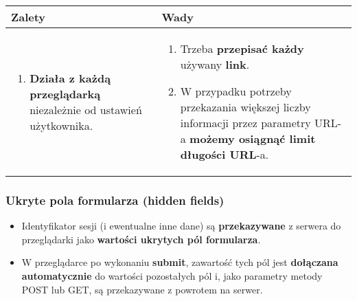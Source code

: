 \documentclass[../main.tex]{subfiles}
\begin{document}
    \begin{table}[H]
        \begin{center}
            \begin{tabular}{p{8cm} | p{8cm}}
                \textbf{Zalety} & \textbf{Wady} \\
                \hline
                \begin{enumerate}
                    \item \textbf{Działa z każdą przeglądarką} niezależnie od ustawień użytkownika.
                \end{enumerate}
                &
                \begin{enumerate}
                    \item Trzeba \textbf{przepisać każdy} używany \textbf{link}.
                    \item W przypadku potrzeby przekazania większej liczby informacji przez parametry URL-a \textbf{możemy osiągnąć limit długości URL}-a.
                \end{enumerate} \\
            \end{tabular}
        \end{center}
    \end{table}

    \subsubsection{Ukryte pola formularza (hidden fields)}
    \begin{itemize}
        \item Identyfikator sesji (i ewentualne inne dane) są \textbf{przekazywane} z serwera do przeglądarki jako \textbf{wartości ukrytych pól formularza}.
        \item W przeglądarce po wykonaniu \textbf{submit}, zawartość tych pól jest \textbf{dołączana automatycznie} do wartości pozostałych pól i, jako parametry metody POST lub
        GET, są przekazywane z powrotem na serwer.
    \end{itemize}
\end{document}
